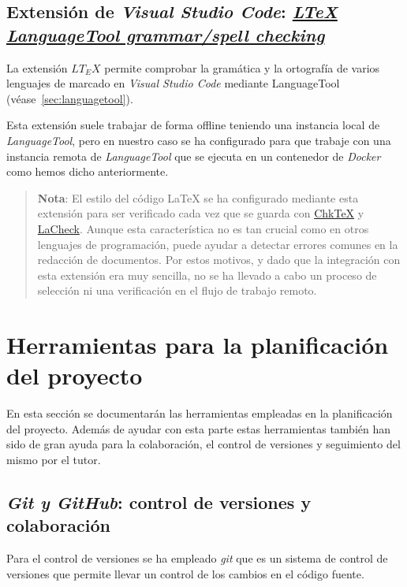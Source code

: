 \subsection{Extensión de \textit{Visual Studio Code}: \href{https://github.com/valentjn/vscode-ltex}{\textit{LTeX LanguageTool grammar/spell checking}}}

La extensión \( LT_E X \) permite comprobar la gramática y la ortografía de varios lenguajes de marcado en \textit{Visual Studio Code} mediante LanguageTool (véase~\ref{sec:languagetool}).

Esta extensión suele trabajar de forma offline teniendo una instancia local de \textit{LanguageTool}, pero en nuestro caso se ha configurado para que trabaje con una instancia remota de \textit{LanguageTool} que se ejecuta en un contenedor de \textit{Docker} como hemos dicho anteriormente.

\begin{quote}
    \textbf{Nota}: El estilo del código \LaTeX{} se ha configurado mediante esta extensión para ser verificado cada vez que se guarda con \href{https://www.nongnu.org/chktex/}{ChkTeX} y \href{https://ctan.org/pkg/lacheck}{LaCheck}. Aunque esta característica no es tan crucial como en otros lenguajes de programación, puede ayudar a detectar errores comunes en la redacción de documentos. Por estos motivos, y dado que la integración con esta extensión era muy sencilla, no se ha llevado a cabo un proceso de selección ni una verificación en el flujo de trabajo remoto.
\end{quote}

\section{Herramientas para la planificación del proyecto}

En esta sección se documentarán las herramientas empleadas en la planificación del proyecto. Además de ayudar con esta parte estas herramientas también han sido de gran ayuda para la colaboración, el control de versiones y seguimiento del mismo por el tutor.

\subsection{\textit{Git y GitHub}: control de versiones y colaboración}

Para el control de versiones se ha empleado \textit{git} que es un sistema de control de versiones que permite llevar un control de los cambios en el código fuente.

